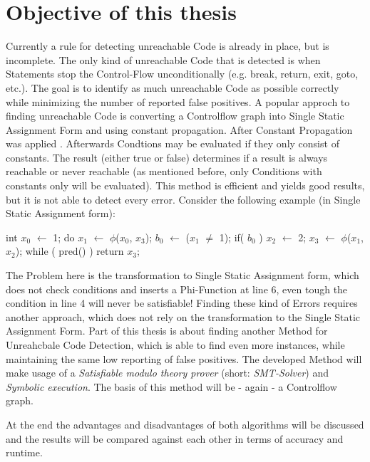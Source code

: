 \section{Objective of this thesis}
Currently a rule for detecting unreachable Code is already in place, but is incomplete.
The only kind of unreachable Code that is detected is when Statements stop the Control-Flow unconditionally (e.g. break, return, exit, goto, etc.).
The goal is to identify as much unreachable Code as possible correctly while minimizing the number of reported false positives.
A popular approch to finding unreachable Code is converting a Controlflow graph into Single Static Assignment Form and using constant propagation. After Constant Propagation was applied \cite{Click_1995}.
Afterwards Condtions may be evaluated if they only consist of constants. The result (either true or false) determines if a result is always reachable or never reachable (as mentioned before, only Conditions with constants only will be evaluated).
This method is efficient and yields good results, but it is not able to detect every error.
Consider the following example \cite{Click_1995} (in Single Static Assignment form):
\begin{GenericCode}
int $x_0$ $\leftarrow$ 1;
do { $x_1$ $\leftarrow$ $\phi$($x_0$, $x_3$);
    $b_0$ $\leftarrow$ ($x_{1}$ $\neq$ 1);
    if( $b_0$ )
        $x_2$ $\leftarrow$ 2;
    $x_3$ $\leftarrow$ $\phi$($x_1$, $x_2$);
} while ( pred() )
return $x_3$;
\end{GenericCode}
The Problem here is the transformation to Single Static Assignment form, which does not check conditions and inserts a Phi-Function at line 6, even tough the condition in line 4 will never be satisfiable!
Finding these kind of Errors requires another approach, which does not rely on the transformation to the Single Static Assignment Form.
Part of this thesis is about finding another Method for Unreahcbale Code Detection, which is able to find even more instances, while maintaining the same low reporting of false positives.
The developed Method will make usage of a \emph{Satisfiable modulo theory prover} (short: \emph{SMT-Solver}) and \emph{Symbolic execution}. The basis of this method will be - again - a Controlflow graph.

At the end the advantages and disadvantages of both algorithms will be discussed and the results will be compared against each other in terms of accuracy and runtime.

